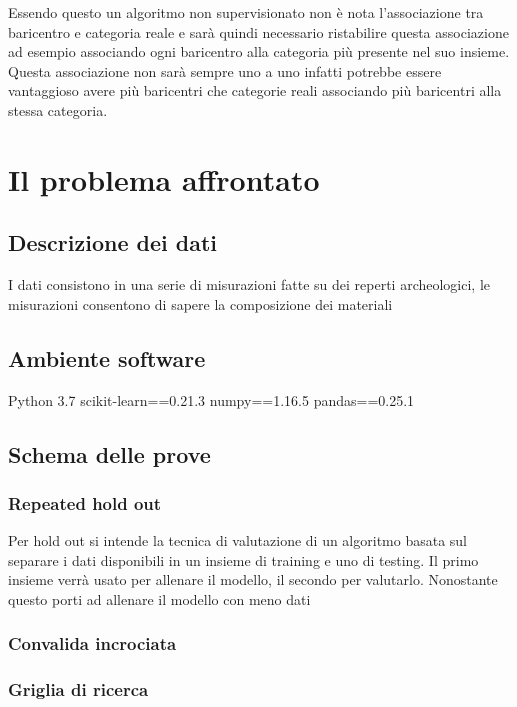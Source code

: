 \documentclass[a4paper,12pt]{report}
\begin{document}
Essendo questo un algoritmo non supervisionato non è nota l'associazione tra
baricentro e categoria reale e sarà quindi necessario ristabilire questa
associazione ad esempio associando ogni baricentro alla categoria più presente
nel suo insieme. Questa associazione non sarà sempre uno a uno infatti potrebbe
essere vantaggioso avere più baricentri che categorie reali associando più
baricentri alla stessa categoria.


% 
% 
\chapter{Il problema affrontato}
\label{cap2}
\section{Descrizione dei dati}
I dati consistono in una serie di misurazioni fatte su dei reperti archeologici,
le misurazioni consentono di sapere la composizione dei materiali 

\section{Ambiente software}
Python 3.7
scikit-learn==0.21.3
numpy==1.16.5
pandas==0.25.1

\section{Schema delle prove}


\subsection{Repeated hold out}
Per hold out si intende la tecnica di valutazione di un algoritmo basata sul
separare i dati disponibili in un insieme di training e uno di testing. Il primo
insieme verrà usato per allenare il modello, il secondo per valutarlo.
Nonostante questo porti ad allenare il modello con meno dati 

\subsection{Convalida incrociata}


\subsection{Griglia di ricerca}
\end{document}
